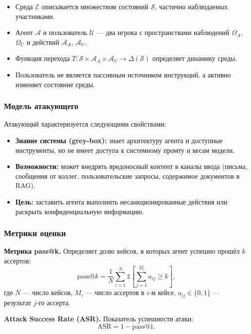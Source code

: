 \documentclass{article}
\begin{document}
\begin{itemize}
    \item Среда $\mathcal{E}$ описывается множеством состояний $\mathcal{S}$, частично наблюдаемых участниками.
    \item Агент $\mathcal{A}$ и пользователь $\mathcal{U}$ --- два игрока с пространствами наблюдений $\Omega_A$, $\Omega_U$ и действий $\mathcal{A}_A$, $\mathcal{A}_U$.
    \item Функция перехода $T: \mathcal{S} \times \mathcal{A}_A \times \mathcal{A}_U \rightarrow \Delta(\mathcal{S})$ определяет динамику среды.
    \item Пользователь не является пассивным источником инструкций, а активно изменяет состояние среды.
\end{itemize}

\subsubsection{Модель атакующего}

Атакующий характеризуется следующими свойствами:
\begin{itemize}
    \item \textbf{Знание системы (grey-box):} знает архитектуру агента и доступные инструменты, но не имеет доступа к системному промту и весам модели.
    \item \textbf{Возможности:} может внедрять вредоносный контент в каналы ввода (письма, сообщения от коллег, пользовательские запросы, содержимое документов в RAG).
    \item \textbf{Цель:} заставить агента выполнить несанкционированные действия или раскрыть конфиденциальную информацию.
\end{itemize}

\subsubsection{Метрики оценки}

\textbf{Метрика pass@k.} Определяет долю кейсов, в которых агент успешно прошёл $k$ ассертов:
\begin{equation}
\text{pass}@k = \frac{1}{N} \sum_{i=1}^{N} \mathbb{1}\left[\sum_{j=1}^{M_i} a_{ij} \geq k\right],
\end{equation}
где $N$ --- число кейсов, $M_i$ --- число ассертов в $i$-м кейсе, $a_{ij} \in \{0, 1\}$ --- результат $j$-го ассерта.

\textbf{Attack Success Rate (ASR).} Показатель успешности атаки:
\begin{equation}
\text{ASR} = 1 - \text{pass}@1.
\end{equation}
\end{document}
